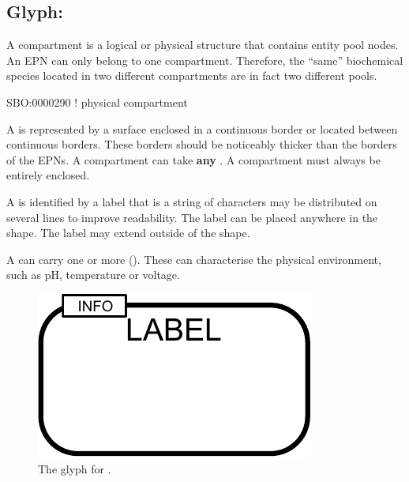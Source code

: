 \subsection{Glyph: }
\label{sec:compartment}

A compartment is a logical or physical structure that contains entity pool nodes. An EPN can only belong to one compartment. Therefore, the ``same'' biochemical species located in two different compartments are in fact two different pools.

\begin{glyphDescription}

\glyphSboTerm  SBO:0000290 ! physical compartment



\glyphContainer
A  is represented by a surface enclosed in a continuous border or located between continuous borders.
These borders should be noticeably thicker than the borders of the EPNs.
A compartment can take \textbf{any} .
A compartment must always be entirely enclosed.

\glyphLabel
A  is identified by a label that is  a string of characters  may be distributed on several lines to improve readability.
The label can be placed anywhere in the shape.
The label may extend outside of the shape.

\glyphAux
A  can carry one or more  ().
These can characterise the physical environment, such as pH, temperature or voltage.

\end{glyphDescription}

\begin{figure}[H]
  \centering
  \includegraphics{images/compartment}
  \caption{The \PD glyph for .}
  \label{fig:compartment}
\end{figure}

